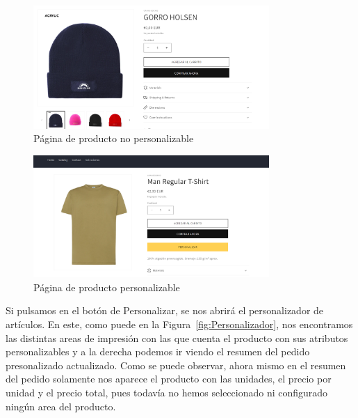 \documentclass[12pt]{article}
\begin{document}
\begin{figure}[ht]
    \centering
    \includegraphics[width=0.8\textwidth]{imagenes/ManualUsuario/PaginaProductoSinPersonalizacion.png}
    \caption{\label{fig:ProductoNoPersonalizable}Página de producto no personalizable}
    \vspace{\fill}
\end{figure}

\begin{figure}[ht]
    \centering
    \includegraphics[width=0.8\textwidth]{imagenes/ManualUsuario/PaginaProductoConPersonalizacion.png}
    \caption{\label{fig:ProductoPersonalizable}Página de producto personalizable}
    \vspace{\fill}
\end{figure}

Si pulsamos en el botón de Personalizar, se nos abrirá el personalizador de artículos. En este, como puede en la Figura~\ref{fig:Personalizador}, nos encontramos 
las distintas areas de impresión con las que cuenta el producto con sus atributos personalizables y a la derecha podemos ir viendo el resumen del pedido presonalizado actualizado.
Como se puede observar, ahora mismo en el resumen del pedido solamente nos aparece el producto con las unidades, el precio por unidad y el precio total, pues todavía no hemos seleccionado ni configurado
ningún area del producto.
\end{document}

